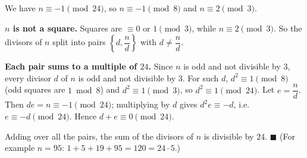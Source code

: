 We have $n\equiv-1\pmod{24}$, so $n\equiv-1\pmod 8$ and $n\equiv2\pmod3$.

\textbf{$n$ is not a square.} Squares are $\equiv0$ or $1\pmod3$, while $n\equiv2\pmod3$. So the divisors of $n$ split into pairs $\left\{d,\dfrac {n}{d}\right\}$ with $d\ne\dfrac {n}{d}$.

\textbf{Each pair sums to a multiple of $24$.} Since $n$ is odd and not divisible by $3$, every divisor $d$ of $n$ is odd and not divisible by $3$. For such $d$, $d^2\equiv1\pmod8$ (odd squares are $1\bmod8$) and $d^2\equiv1\pmod3$, so $d^2\equiv1\pmod{24}$. Let $e=\dfrac {n}{d}$. Then $de=n\equiv-1\pmod{24}$; multiplying by $d$ gives $d^2e\equiv-d$, i.e.\ $e\equiv-d\pmod{24}$. Hence $d+e\equiv0\pmod{24}$.

Adding over all the pairs, the sum of the divisors of $n$ is divisible by $24$. $\blacksquare$ (For example $n=95$: $1+5+19+95=120=24\cdot5$.)
